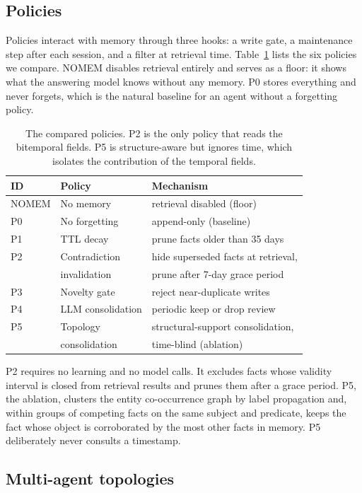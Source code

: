 \documentclass[letterpaper]{article} %
\begin{document}
\subsection{Policies}

Policies interact with memory through three hooks: a write gate, a maintenance step after each session, and a filter at retrieval time. Table~\ref{tab:policies} lists the six policies we compare. NOMEM disables retrieval entirely and serves as a floor: it shows what the answering model knows without any memory. P0 stores everything and never forgets, which is the natural baseline for an agent without a forgetting policy.

\begin{table}[t]
\centering
\small
\begin{tabular}{@{}lll@{}}
\toprule
ID & Policy & Mechanism \\
\midrule
NOMEM & No memory & retrieval disabled (floor) \\
P0 & No forgetting & append-only (baseline) \\
P1 & TTL decay & prune facts older than 35 days \\
P2 & Contradiction & hide superseded facts at retrieval, \\
   & invalidation & prune after 7-day grace period \\
P3 & Novelty gate & reject near-duplicate writes \\
P4 & LLM consolidation & periodic keep or drop review \\
P5 & Topology & structural-support consolidation, \\
   & consolidation & time-blind (ablation) \\
\bottomrule
\end{tabular}
\caption{The compared policies. P2 is the only policy that reads the bitemporal fields. P5 is structure-aware but ignores time, which isolates the contribution of the temporal fields.}
\label{tab:policies}
\end{table}

P2 requires no learning and no model calls. It excludes facts whose validity interval is closed from retrieval results and prunes them after a grace period. P5, the ablation, clusters the entity co-occurrence graph by label propagation and, within groups of competing facts on the same subject and predicate, keeps the fact whose object is corroborated by the most other facts in memory. P5 deliberately never consults a timestamp.

\subsection{Multi-agent topologies}
\end{document}
